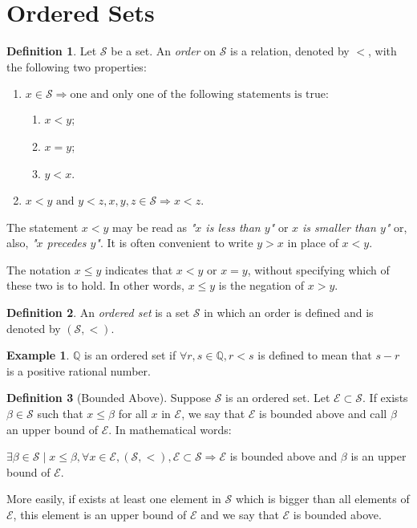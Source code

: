 \documentclass[11pt, a4paper]{amsart}
\numberwithin{equation}{section}
\theoremstyle{plain} %
\theoremstyle{definition}
\newtheorem{defn}{Definition}[section]
\newtheorem{ex}{Example}[section]
\theoremstyle{remark}
\begin{document}
\section{Ordered Sets}

\begin{defn}
Let $\mathcal{S}$ be a set. An \textit{order} on $\mathcal{S}$ is a relation, denoted by $<$, with the following two properties:
\begin{enumerate}
    \item $x \in \mathcal{S} \Rightarrow \text{one and only one of the following statements is true:}$
    \begin{enumerate}
        \item $x<y$;
        \item $x=y$;
        \item $y<x$.
    \end{enumerate}
    \item $x<y \text{ and } y<z, x,y,z \in \mathcal{S} \Rightarrow x<z$.
\end{enumerate}
\end{defn}

The statement $x<y$ may be read as \textit{"$x$ is less than $y$"} or \textit{$x$ is smaller than $y$"} or, also, \textit{"$x$ precedes $y$"}. It is often convenient to write $y>x$ in place of $x<y$.

The notation $x\leq y$ indicates that $x<y$ or $x=y$, without specifying which of these two is to hold. In other words, $x\leq y$ is the negation of $x>y$.

\begin{defn}
An \textit{ordered set} is a set $\mathcal{S}$ in which an order is defined and is denoted by $(\mathcal{S}, <)$.
\end{defn}

\begin{ex}
$\mathbb{Q}$ is an ordered set if $\forall r,s \in \mathbb{Q}, r<s$ is defined to mean that $s-r$ is a positive rational number.
\end{ex}

\begin{defn}[Bounded Above]
Suppose $\mathcal{S}$ is an ordered set. Let $\mathcal{E}\subset\mathcal{S}$. If exists $\beta \in \mathcal{S}$ such that $x \leq \beta$ for all $x$ in $\mathcal{E}$, we say that $\mathcal{E}$ is bounded above and call $\beta$ an upper bound of $\mathcal{E}$. In mathematical words:

\begin{center}
    $\exists \beta\in\mathcal{S} \mid x\leq\beta, \forall x\in\mathcal{E},(\mathcal{S},<),\mathcal{E}\subset\mathcal{S}\Rightarrow\mathcal{E}$ is bounded above and $\beta$ is an upper bound of $\mathcal{E}$.
\end{center}
\end{defn}
More easily, if exists at least one element in $\mathcal{S}$ which is bigger than all elements of $\mathcal{E}$, this element is an upper bound of $\mathcal{E}$ and we say that $\mathcal{E}$ is bounded above.
\end{document}
